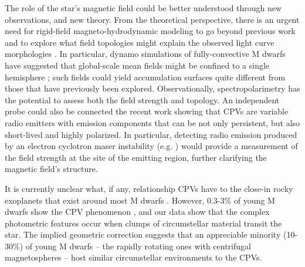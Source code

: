 \documentclass{nature3}
\begin{document}
The role of the star's magnetic field could be better understood through
new observations, and new theory.  From the theoretical perspective,
there is an urgent need for rigid-field magneto-hydrodynamic modeling to
go beyond previous work \cite{Townsend2005,Townsend2008,Krticka2022} and
to explore what field topologies might explain the observed light curve
morphologies \cite{Bouma2024}.  In particular, dynamo simulations of
fully-convective M dwarfs have suggested that global-scale mean fields
might be confined to a single hemisphere \cite{Brown2020}; such fields
could yield accumulation surfaces quite different from those that have
previously been explored.  Observationally, spectropolarimetry has the
potential to assess both the field strength and topology.  An
independent probe could also be connected the recent work
\cite{Kaur2024} showing that CPVs are variable radio emitters with
emission components that can be not only persistent, but also
short-lived and highly polarized.  In particular, detecting radio
emission produced by an electron cyclotron maser instability (e.g.
\cite{Callingham2021}) would provide a measurement of the field strength
at the site of the emitting region, further clarifying the magnetic
field's structure.


It is currently unclear what, if any, relationship CPVs have to the
close-in rocky exoplanets that exist around most M dwarfs
\cite{Dressing2015}.  However, 0.3-3\% of young M dwarfs show the CPV
phenomenon \cite{Rebull2020}, and our data show that the complex
photometric features occur when clumps of circumstellar material 
transit the star.  The implied geometric correction suggests that
an appreciable minority (10-30\%) of young M dwarfs -- the rapidly
rotating ones with centrifugal magnetospheres -- host similar
circumstellar environments to the CPVs.




\end{document}
